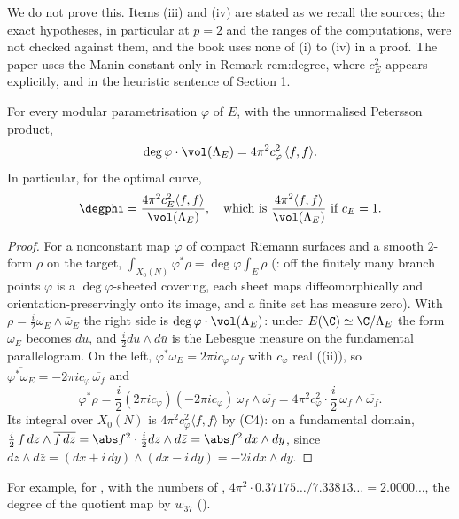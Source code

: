 We do not prove this. Items (iii) and (iv) are stated as we recall the sources; the exact hypotheses, in particular at $p=2$ and the ranges of the computations, were not
checked against them, and the book uses none of (i) to (iv) in a proof. The paper uses the Manin constant only in Remark rem:degree, where $c_E^2$ appears explicitly, and in
the heuristic sentence of Section 1.

\begin{theorem}\label{thm:moddeg:zagier-watkins}
For every modular parametrisation $\varphi$ of $E$, with the unnormalised Petersson product,
\[
\deg\varphi\cdot\vol(\Lambda_E)=4\pi^2c_\varphi^2\,\langle f,f\rangle.
\]
In particular, for the optimal curve,
\[
\degphi=\frac{4\pi^2c_E^2\langle f,f\rangle}{\vol(\Lambda_E)},\quad\text{which is }\frac{4\pi^2\langle f,f\rangle}{\vol(\Lambda_E)}\text{ if }c_E=1.
\]
\end{theorem}

\begin{proof}
For a nonconstant map $\varphi$ of compact Riemann surfaces and a smooth $2$-form $\rho$ on the target, $\int_{X_0(N)}\varphi^*\rho=\deg\varphi\int_E\rho$ (: off the
finitely many branch points $\varphi$ is a $\deg\varphi$-sheeted covering, each sheet maps diffeomorphically and orientation-preservingly onto its image, and a finite set has measure zero).
With $\rho=\frac i2\omega_E\wedge\bar\omega_E$ the right side is $\deg\varphi\cdot\vol(\Lambda_E)$: under $E(\C)\simeq\C/\Lambda_E$ the form $\omega_E$ becomes $du$, and
$\frac i2du\wedge d\bar u$ is the Lebesgue measure on the fundamental parallelogram. On the left, $\varphi^*\omega_E=2\pi ic_\varphi\,\omega_f$ with $c_\varphi$ real
((ii)), so $\overline{\varphi^*\omega_E}=-2\pi ic_\varphi\,\overline{\omega_f}$ and
\[
\varphi^*\rho=\frac i2(2\pi ic_\varphi)(-2\pi ic_\varphi)\,\omega_f\wedge\overline{\omega_f}=4\pi^2c_\varphi^2\cdot\frac i2\,\omega_f\wedge\overline{\omega_f}.
\]
Its integral over $X_0(N)$ is $4\pi^2c_\varphi^2\langle f,f\rangle$ by (C4): on a fundamental domain, $\frac i2\,f\,dz\wedge\overline{f\,dz}=\abs f^2\cdot\frac i2dz\wedge d\bar z=\abs f^2\,dx\wedge dy$,
since $dz\wedge d\bar z=(dx+i\,dy)\wedge(dx-i\,dy)=-2i\,dx\wedge dy$.
\end{proof}

For example, for , with the numbers of , $4\pi^2\cdot0.37175\ldots/7.33813\ldots=2.0000\ldots$, the degree of the quotient map by $w_{37}$ ().

